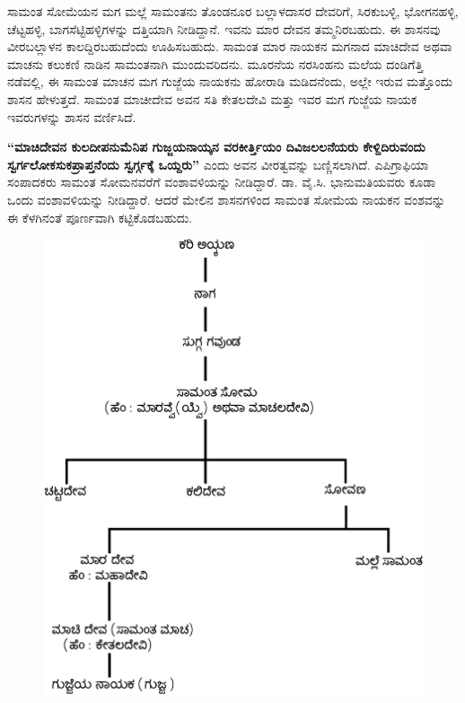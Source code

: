 ಸಾಮಂತ ಸೋಮೆಯನ ಮಗ ಮಲ್ಲೆ ಸಾಮಂತನು ತೊಂಡನೂರ ಬಲ್ಲಾಳದಾಸರ ದೇವರಿಗೆ, ಸಿರಕುಬಳ್ಳಿ, ಭೋಗನಹಳ್ಳಿ, ಚೆಟ್ಟಹಳ್ಳಿ, ಬಾಗಸೆಟ್ಟಿಹಳ್ಳಿಗಳನ್ನು ದತ್ತಿಯಾಗಿ ನೀಡಿದ್ದಾನೆ. ಇವನು ಮಾರ ದೇವನ ತಮ್ಮನಿರಬಹುದು. ಈ ಶಾಸನವು ವೀರಬಲ್ಲಾಳನ ಕಾಲದ್ದಿರಬಹುದೆಂದು ಊಹಿಸಬಹುದು. ಸಾಮಂತ ಮಾರ ನಾಯಕನ ಮಗನಾದ ಮಾಚಿದೇವ ಅಥವಾ ಮಾಚನು ಕಲುಕಣಿ ನಾಡಿನ ಸಾಮಂತನಾಗಿ ಮುಂದುವರಿದನು. ಮೂರನೆಯ ನರಸಿಂಹನು ಮಲೆಯ ದಂಡಿಗೆತ್ತಿ ನಡೆವಲ್ಲಿ, ಈ ಸಾಮಂತ ಮಾಚನ ಮಗ ಗುಜ್ಜೆಯ ನಾಯಕನು ಹೋರಾಡಿ ಮಡಿದನೆಂದು, ಅಲ್ಲೇ ಇರುವ ಮತ್ತೊಂದು ಶಾಸನ ಹೇಳುತ್ತದೆ. ಸಾಮಂತ ಮಾಚೀದೇವ ಅವನ ಸತಿ ಕೇತಲದೇವಿ ಮತ್ತು ಇವರ ಮಗ ಗುಜ್ಜೆಯ ನಾಯಕ ಇವರುಗಳನ್ನು ಶಾಸನ ವರ್ಣಿಸಿದೆ.

\textbf{“ಮಾಚಿದೇವನ ಕುಲದೀಪನುಮೆನಿಪ ಗುಜ್ಜಯನಾಯ್ಕನ ವರಕೀರ್ತ್ತಿಯಂ ದಿವಿಜಲಲನೆಯರು ಕೇಳ್ದಿದಿರುವಂದು\general{\break } ಸ್ವರ್ಗಲೋಕಸುಕಪ್ರಾಪ್ತನೆಂದು ಸ್ವರ್ಗ್ಗಕ್ಕೆ ಒಯ್ದರು”} ಎಂದು ಅವನ ವೀರತ್ವವನ್ನು ಬಣ್ಣಿಸಲಾಗಿದೆ. ಎಪಿಗ್ರಾಫಿಯಾ ಸಂಪಾದಕರು ಸಾಮಂತ ಸೋಮನವರೆಗೆ ವಂಶಾವಳಿಯನ್ನು ನೀಡಿದ್ದಾರೆ. ಡಾ. ವೈ.ಸಿ. ಭಾನುಮತಿಯವರು ಕೂಡಾ ಒಂದು ವಂಶಾವಳಿಯನ್ನು ನೀಡಿದ್ದಾರೆ. ಆದರೆ ಮೇಲಿನ ಶಾಸನಗಳಿಂದ ಸಾಮಂತ ಸೋಮೆಯ ನಾಯಕನ ವಂಶವನ್ನು ಈ ಕೆಳಗಿನಂತೆ ಪೂರ್ಣವಾಗಿ ಕಟ್ಟಿಕೊಡಬಹುದು.

\begin{figure}[H]
\includegraphics[scale=1.3]{images/chap3/chap3fig8.jpeg}
\end{figure}

